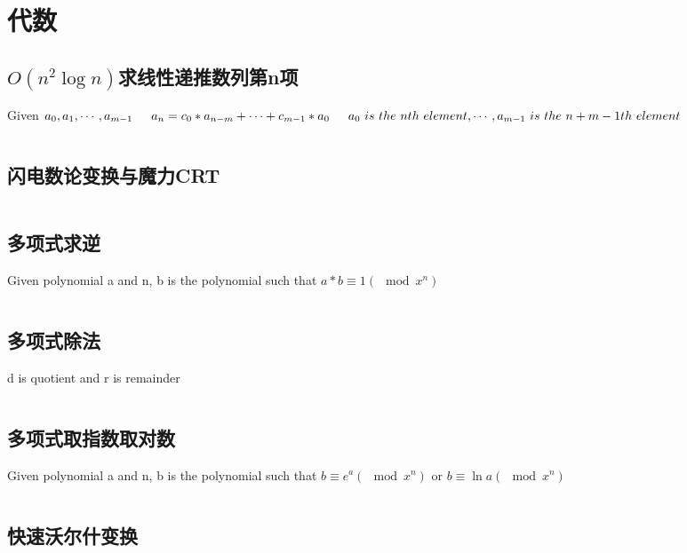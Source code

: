 \chapter{代数}
\section{$O(n^2\log n)$求线性递推数列第n项}
Given $a_0, a_1, \cdots , a_{m-1} \\
\indent a_n = c_0 * a_{n-m} + \cdots + c_{m-1} * a_0 \\
\indent a_0 \ is \ the \ nth \ element, \cdots, a_{m-1} \ is \ the \ n+m-1th \ element
$
\inputminted{cpp}{\source/algebra/linear-recursion.cpp}
\section{闪电数论变换与魔力CRT}
\inputminted{cpp}{\source/algebra/NTT+CRT.cpp}
\section{多项式求逆}
Given polynomial a and n, b is the polynomial such that $a * b \equiv 1 (\mod x^n) $
\inputminted{cpp}{\source/algebra/polynomial-inverse.cpp}
\section{多项式除法}
d is quotient and r is remainder
\inputminted{cpp}{\source/algebra/polynomial-divide.cpp}
\section{多项式取指数取对数}
Given polynomial a and n, b is the polynomial such that $b \equiv e^a (\mod x^n)$ or $b \equiv \ln a (\mod x^n)$
\inputminted{cpp}{\source/algebra/polynomial-expandln.cpp}
\section{快速沃尔什变换}
\inputminted{cpp}{\source/algebra/FWT.cpp}